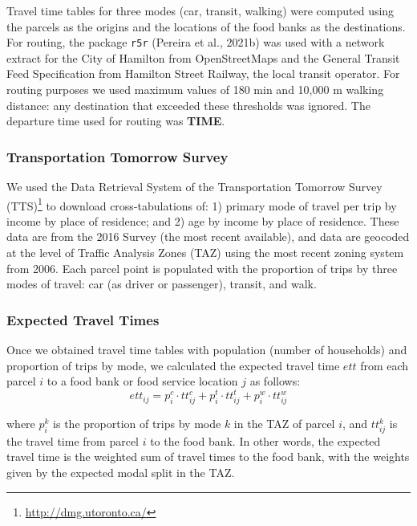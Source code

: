 \documentclass[]{elsarticle} %
\begin{document}
Travel time tables for three modes (car, transit, walking) were computed
using the parcels as the origins and the locations of the food banks as
the destinations. For routing, the package \texttt{r5r} (Pereira et al.,
2021b) was used with a network extract for the City of Hamilton from
OpenStreetMaps and the General Transit Feed Specification from Hamilton
Street Railway, the local transit operator. For routing purposes we used
maximum values of 180 min and 10,000 m walking distance: any destination
that exceeded these thresholds was ignored. The departure time used for
routing was \textbf{TIME}.

\hypertarget{transportation-tomorrow-survey}{%
\subsubsection{Transportation Tomorrow
Survey}\label{transportation-tomorrow-survey}}

We used the Data Retrieval System of the Transportation Tomorrow Survey
(TTS)\footnote{\url{http://dmg.utoronto.ca/}} to download
cross-tabulations of: 1) primary mode of travel per trip by income by
place of residence; and 2) age by income by place of residence. These
data are from the 2016 Survey (the most recent available), and data are
geocoded at the level of Traffic Analysis Zones (TAZ) using the most
recent zoning system from 2006. Each parcel point is populated with the
proportion of trips by three modes of travel: car (as driver or
passenger), transit, and walk.

\hypertarget{expected-travel-times}{%
\subsubsection{Expected Travel Times}\label{expected-travel-times}}

Once we obtained travel time tables with population (number of
households) and proportion of trips by mode, we calculated the expected
travel time \(ett\) from each parcel \(i\) to a food bank or food
service location \(j\) as follows: \[
ett_{ij} = p^c_i\cdot tt^c_{ij} + p^t_i\cdot tt^t_{ij} + p^w_i\cdot tt^w_{ij}
\]

\noindent where \(p^k_i\) is the proportion of trips by mode \(k\) in
the TAZ of parcel \(i\), and \(tt^k_{ij}\) is the travel time from
parcel \(i\) to the food bank. In other words, the expected travel time
is the weighted sum of travel times to the food bank, with the weights
given by the expected modal split in the TAZ.
\end{document}
